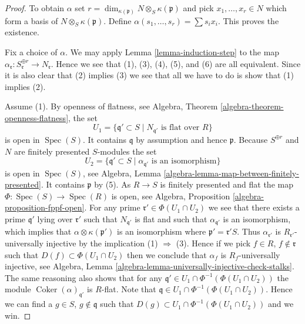 \documentclass[10pt,a4paper]{amsart}
\theoremstyle{plain}
\theoremstyle{definition}
\theoremstyle{remark}
\numberwithin{equation}{subsection}
\def\Spec{\mathop{\mathrm{Spec}}}
\def\Coker{\mathop{\mathrm{Coker}}}
\begin{document}
\begin{proof}
To obtain $\alpha$ set
$r = \dim_{\kappa(\mathfrak p)} N \otimes_S \kappa(\mathfrak p)$ and pick
$x_1, \ldots, x_r \in N$ which form a basis of
$N \otimes_S \kappa(\mathfrak p)$. Define
$\alpha(s_1, \ldots, s_r) = \sum s_i x_i$. This proves the existence.

\medskip\noindent
Fix a choice of $\alpha$.
We may apply
Lemma \ref{lemma-induction-step}
to the map
$\alpha_{\mathfrak r} : S_{\mathfrak r}^{\oplus r} \to N_{\mathfrak r}$.
Hence we see that (1), (3), (4), (5), and (6) are all equivalent.
Since it is also clear that (2) implies (3) we see that all we have to
do is show that (1) implies (2).

\medskip\noindent
Assume (1). By openness of flatness, see
Algebra, Theorem \ref{algebra-theorem-openness-flatness},
the set
$$
U_1 = \{\mathfrak q' \subset S \mid N_{\mathfrak q'}\text{ is flat over }R\}
$$
is open in $\Spec(S)$. It contains $\mathfrak q$ by assumption
and hence $\mathfrak p$. Because $S^{\oplus r}$ and $N$ are finitely presented
$S$-modules the set
$$
U_2 = \{\mathfrak q' \subset S \mid
\alpha_{\mathfrak q'}\text{ is an isomorphism}\}
$$
is open in $\Spec(S)$, see
Algebra, Lemma \ref{algebra-lemma-map-between-finitely-presented}.
It contains $\mathfrak p$ by (5). As $R \to S$
is finitely presented and flat the map
$\Phi : \Spec(S) \to \Spec(R)$ is open, see
Algebra, Proposition \ref{algebra-proposition-fppf-open}.
For any prime $\mathfrak r' \in \Phi(U_1 \cap U_2)$ we see that
there exists a prime $\mathfrak q'$ lying over $\mathfrak r'$ such that
$N_{\mathfrak q'}$ is flat and such that $\alpha_{\mathfrak q'}$ is
an isomorphism, which implies that $\alpha \otimes \kappa(\mathfrak p')$
is an isomorphism where $\mathfrak p' = \mathfrak r' S$. Thus
$\alpha_{\mathfrak r'}$ is $R_{\mathfrak r'}$-universally injective
by the implication (1) $\Rightarrow$ (3).
Hence if we pick $f \in R$, $f \not \in \mathfrak r$ such that
$D(f) \subset \Phi(U_1 \cap U_2)$ then we conclude that
$\alpha_f$ is $R_f$-universally injective, see
Algebra, Lemma \ref{algebra-lemma-universally-injective-check-stalks}.
The same reasoning also shows that for any
$\mathfrak q' \in U_1 \cap \Phi^{-1}(\Phi(U_1 \cap U_2))$
the module $\Coker(\alpha)_{\mathfrak q'}$ is $R$-flat.
Note that $\mathfrak q \in U_1 \cap \Phi^{-1}(\Phi(U_1 \cap U_2))$.
Hence we can find a $g \in S$, $g \not \in \mathfrak q$ such
that $D(g) \subset U_1 \cap \Phi^{-1}(\Phi(U_1 \cap U_2))$
and we win.
\end{proof}
\end{document}
